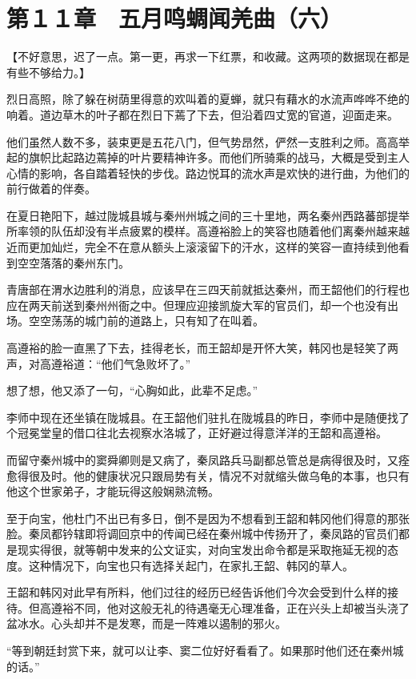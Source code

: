 \section{第１１章　五月鸣蜩闻羌曲（六）}

【不好意思，迟了一点。第一更，再求一下红票，和收藏。这两项的数据现在都是有些不够给力。】

烈日高照，除了躲在树荫里得意的欢叫着的夏蝉，就只有藉水的水流声哗哗不绝的响着。道边草木的叶子都在烈日下蔫了下去，但沿着四丈宽的官道，迎面走来。

他们虽然人数不多，装束更是五花八门，但气势昂然，俨然一支胜利之师。高高举起的旗帜比起路边蔫掉的叶片要精神许多。而他们所骑乘的战马，大概是受到主人心情的影响，各自踏着轻快的步伐。路边悦耳的流水声是欢快的进行曲，为他们的前行做着的伴奏。

在夏日艳阳下，越过陇城县城与秦州州城之间的三十里地，两名秦州西路蕃部提举所率领的队伍却没有半点疲累的模样。高遵裕脸上的笑容也随着他们离秦州越来越近而更加灿烂，完全不在意从额头上滚滚留下的汗水，这样的笑容一直持续到他看到空空落落的秦州东门。

青唐部在渭水边胜利的消息，应该早在三四天前就抵达秦州，而王韶他们的行程也应在两天前送到秦州州衙之中。但理应迎接凯旋大军的官员们，却一个也没有出场。空空荡荡的城门前的道路上，只有知了在叫着。

高遵裕的脸一直黑了下去，挂得老长，而王韶却是开怀大笑，韩冈也是轻笑了两声，对高遵裕道：“他们气急败坏了。”

想了想，他又添了一句，“心胸如此，此辈不足虑。”

李师中现在还坐镇在陇城县。在王韶他们驻扎在陇城县的昨日，李师中是随便找了个冠冕堂皇的借口往北去视察水洛城了，正好避过得意洋洋的王韶和高遵裕。

而留守秦州城中的窦舜卿则是又病了，秦凤路兵马副都总管总是病得很及时，又痊愈得很及时。他的健康状况只跟局势有关，情况不对就缩头做乌龟的本事，也只有他这个世家弟子，才能玩得这般娴熟流畅。

至于向宝，他杜门不出已有多日，倒不是因为不想看到王韶和韩冈他们得意的那张脸。秦凤都钤辖即将调回京中的传闻已经在秦州城中传扬开了，秦凤路的官员们都是现实得很，就等朝中发来的公文证实，对向宝发出命令都是采取拖延无视的态度。这种情况下，向宝也只有选择关起门，在家扎王韶、韩冈的草人。

王韶和韩冈对此早有所料，他们过往的经历已经告诉他们今次会受到什么样的接待。但高遵裕不同，他对这般无礼的待遇毫无心理准备，正在兴头上却被当头浇了盆冰水。心头却并不是发寒，而是一阵难以遏制的邪火。

“等到朝廷封赏下来，就可以让李、窦二位好好看看了。如果那时他们还在秦州城的话。”


